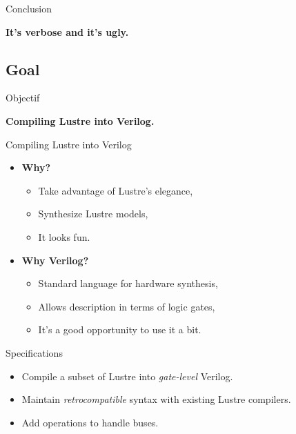 \documentclass{beamer}
\begin{document}
\begin{frame}{Conclusion}
    \begin{LARGE}
        \begin{center}
            \bf
            It's verbose and it's ugly.
        \end{center}
    \end{LARGE}
\end{frame}

\subsection{Goal}

\begin{frame}{Objectif}
    \begin{LARGE}
        \begin{center}
            \bf
            Compiling Lustre into Verilog.
        \end{center}
    \end{LARGE}
\end{frame}

\begin{frame}{Compiling Lustre into Verilog}
    \begin{itemize}
        \item \textbf{Why?}
              \begin{itemize}
                  \item Take advantage of Lustre's elegance,
                  \item Synthesize Lustre models,
                  \item It looks fun.
              \end{itemize}
              \pause{}
        \item \textbf{Why Verilog?}
              \begin{itemize}
                  \item Standard language for hardware synthesis,
                  \item Allows description in terms of logic gates,
                  \item It's a good opportunity to use it a bit.
              \end{itemize}
    \end{itemize}
\end{frame}

\begin{frame}{Specifications}
    \begin{itemize}
        \setlength{\itemsep}{5pt}
        \item Compile a subset of Lustre into \emph{gate-level} Verilog.
        \item Maintain \emph{retrocompatible} syntax with existing Lustre compilers.
        \item Add operations to handle buses.
    \end{itemize}
\end{frame}
\end{document}
